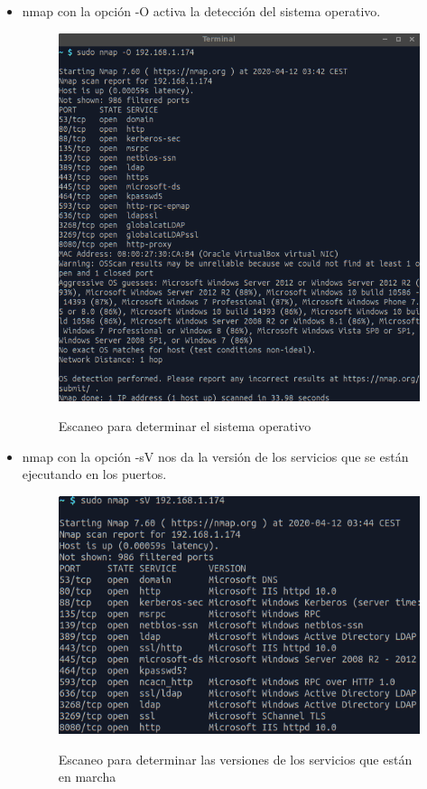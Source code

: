 \documentclass[10pt,a4paper]{article}
\begin{document}
\begin{enumerate}[label=\textbf{\alph*)}]
\begin{itemize}
\item nmap con la opción -O activa la detección del sistema operativo.
\begin{figure}[h!]
  \centering
  \includegraphics[scale=0.4]{k6.png}\\
  \caption{Escaneo para determinar el sistema operativo}
  \label{fig:nmap6}
\end{figure}
\pagebreak
\item nmap con la opción -sV nos da la versión de los servicios que se están ejecutando en los puertos.
\begin{figure}[h!]
  \centering
  \includegraphics[scale=0.4]{k7.png}\\
  \caption{Escaneo para determinar las versiones de los servicios que están en marcha}
  \label{fig:nmap7}
\end{figure}

\end{itemize}

\end{enumerate}
\end{document}
